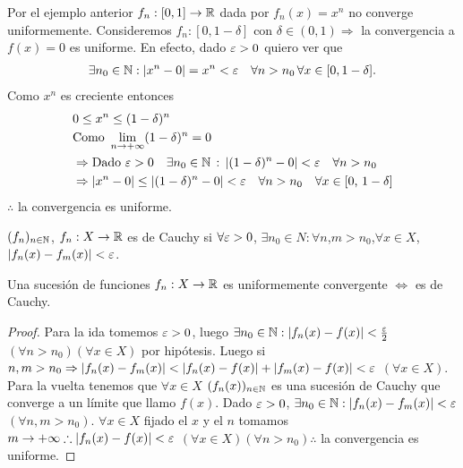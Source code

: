 \begin{eg}
  Por el ejemplo anterior \(f_n: [0, 1] \to \mathbb{R} \) dada por \(f_n(x) = x^n\) no converge uniformemente.
  Consideremos \(f_n: [0, 1 - \delta]\) con \(\delta \in (0, 1) \Rightarrow \) la convergencia a \(f(x) = 0\) es uniforme.
  En efecto, dado \(\varepsilon > 0\) quiero ver que
  \begin{align*}
    \exists n_0 \in \mathbb{N} : |x^n - 0| = x^n < \varepsilon \quad \forall n > n_0 \, \forall x \in [0, 1 - \delta].
  \end{align*}
  Como \(x^n\) es creciente entonces
  \begin{align*}
     & 0 \leq x^n \leq (1 - \delta)^n                                                                                      \\
     & \text{Como } \lim_{n \to +\infty} (1 - \delta)^n = 0                                                                \\
     & \Rightarrow \text{Dado } \varepsilon > 0 \quad \exists n_0 \in \mathbb{N} \, : \, |(1 - \delta)^n - 0 | < \varepsilon \quad \forall n > n_0   \\
     & \Rightarrow |x^n - 0| \leq |(1 - \delta)^n - 0| < \varepsilon \quad \forall n > n_0 \quad \forall x \in [0\text{, }1-\delta]
  \end{align*}
  \(\therefore \) la convergencia es uniforme.
\end{eg}

\begin{definition}
  \((f_n)_{n \in \mathbb{N}} \), \(f_n: X \to \mathbb{R} \) es de Cauchy si \(\forall \varepsilon > 0\), \(\exists n_0 \in N : \forall n\),\(m > n_0\),\(\forall x \in X\), \(|f_n(x) - f_m(x)| < \varepsilon \).
\end{definition}

\begin{theorem}
  Una sucesión de funciones \(f_n : X \to \mathbb{R} \) es uniformemente convergente \(\iff \) es de Cauchy.
  \begin{proof}
    Para la ida tomemos \(\varepsilon > 0\), luego \(\exists n_0 \in \mathbb{N} : |f_n(x) - f(x)| < \frac{\varepsilon}{2} \) \((\forall n > n_0)(\forall x \in X)\) por hipótesis. Luego si \(n, m > n_0 \Rightarrow |f_n(x) - f_m(x)| < |f_n(x) - f(x)| + |f_m(x) - f(x)| < \varepsilon \) \((\forall x \in X)\). \\
    Para la vuelta tenemos que \(\forall x \in X\) \((f_n(x))_{n \in \mathbb{N}} \) es una sucesión de Cauchy que converge a un límite que llamo \(f(x)\). Dado \(\varepsilon > 0\), \(\exists n_0 \in \mathbb{N} : |f_n(x) - f_m(x)| < \varepsilon \) \((\forall n, m > n_0)\). \(\forall x \in X\) fijado el \(x\) y el \(n\) tomamos \(m \to +\infty \therefore |f_n(x) - f(x)| < \varepsilon \) \((\forall x \in X)(\forall n > n_0) \therefore \) la convergencia es uniforme.
  \end{proof}
\end{theorem}

